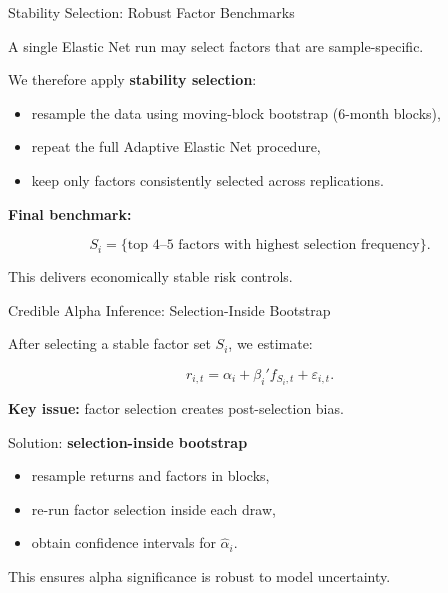 \documentclass[aspectratio=169,11pt]{beamer}
\begin{document}
\begin{frame}{Stability Selection: Robust Factor Benchmarks}
\small

A single Elastic Net run may select factors that are sample-specific.

\vspace{0.3cm}

We therefore apply \textbf{stability selection}:

\begin{itemize}
    \item resample the data using moving-block bootstrap (6-month blocks),
    \item repeat the full Adaptive Elastic Net procedure,
    \item keep only factors consistently selected across replications.
\end{itemize}

\vspace{0.3cm}

\textbf{Final benchmark:}

\[
S_i = \{\text{top 4--5 factors with highest selection frequency}\}.
\]

\vspace{0.2cm}

This delivers economically stable risk controls.

\end{frame}

\begin{frame}{Credible Alpha Inference: Selection-Inside Bootstrap}
\small

After selecting a stable factor set $S_i$, we estimate:

\[
r_{i,t}=\alpha_i+\beta_i'f_{S_i,t}+\varepsilon_{i,t}.
\]

\vspace{0.3cm}

\textbf{Key issue:} factor selection creates post-selection bias.

\vspace{0.3cm}

Solution: \textbf{selection-inside bootstrap}

\begin{itemize}
    \item resample returns and factors in blocks,
    \item re-run factor selection inside each draw,
    \item obtain confidence intervals for $\hat{\alpha}_i$.
\end{itemize}

\vspace{0.2cm}

This ensures alpha significance is robust to model uncertainty.

\end{frame}





\end{document}
